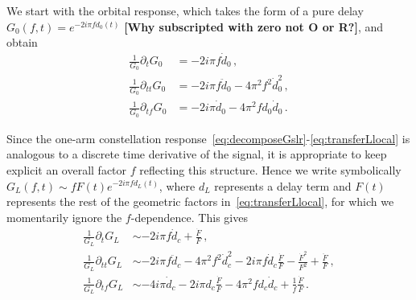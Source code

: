\documentclass[aps,showpacs,twocolumn,
prd,superscriptaddress,nofootinbib]{revtex4-1}
\newcommand{\jgb}[1]{{\color{DarkGreen} #1}}
\begin{document}
We start with the orbital response, which takes the form of a pure delay $G_{0}(f, t) = e^{-2 i \pi f d_{0}(t)}$ \jgb{\bf[Why subscripted with zero not O or R?]}, and obtain
\begin{subequations}
\begin{align}
	\frac{1}{G_{0}} \partial_{t} G_{0} &= -2i\pi f \dot{d}_{0}\,,\\
	\frac{1}{G_{0}} \partial_{tt} G_{0} &= -2i\pi f \ddot{d}_{0} - 4\pi^{2} f^{2} \dot{d}_{0}^{2} \,,\\
	\frac{1}{G_{0}} \partial_{tf} G_{0} &= -2 i \pi \dot{d}_{0} - 4\pi^{2} f d_{0} \dot{d}_{0} \,.
\end{align}
\end{subequations}

Since the one-arm constellation response~\eqref{eq:decomposeGslr}-\eqref{eq:transferLlocal} is analogous to a discrete time derivative of the signal, it is appropriate to keep explicit an overall factor $f$ reflecting this structure. Hence we write symbolically $G_{L}(f,t) \sim f F(t) e^{-2i \pi f d_{L}(t)}$, where $d_{L}$ represents a delay term and $F(t)$ represents the rest of the geometric factors in~\eqref{eq:transferLlocal}, \jgb{for which we momentarily} ignore the $f$-dependence. This gives
\begin{subequations}
\begin{align}
	\frac{1}{G_{L}} \partial_{t} G_{L} &\sim -2i\pi f \dot{d}_{c} + \frac{\dot{F}}{F}\,,\\
	\frac{1}{G_{L}} \partial_{tt} G_{L} &\sim -2i\pi f \ddot{d}_{c} - 4\pi^{2} f^{2} \dot{d}_{c}^{2} - 2i\pi f \dot{d}_{c} \frac{\dot{F}}{F} - \frac{\dot{F}^{2}}{F^{2}} + \frac{\ddot{F}}{F} \,,\\
	\frac{1}{G_{L}} \partial_{tf} G_{L} &\sim -4 i \pi \dot{d}_{c} - 2i\pi d_{c} \frac{\dot{F}}{F} - 4\pi^{2} f d_{c} \dot{d}_{c} + \frac{1}{f}\frac{\dot{F}}{F}\,.
\end{align}
\end{subequations}
\end{document}
